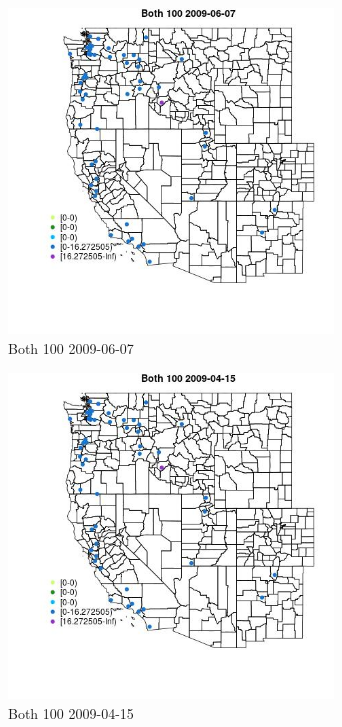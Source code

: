 \begin{figure} 
\centering  
\includegraphics[width=0.77\textwidth]{Code_Outputs/Report_ML_input_PM25_Step4_part_e_de_duplicated_aves_MapObsBoth_1002009-06-07.jpg} 
\caption{\label{fig:Report_ML_input_PM25_Step4_part_e_de_duplicated_avesMapObsBoth_1002009-06-07}Both 100 2009-06-07} 
\end{figure} 
 

\begin{figure} 
\centering  
\includegraphics[width=0.77\textwidth]{Code_Outputs/Report_ML_input_PM25_Step4_part_e_de_duplicated_aves_MapObsBoth_1002009-04-15.jpg} 
\caption{\label{fig:Report_ML_input_PM25_Step4_part_e_de_duplicated_avesMapObsBoth_1002009-04-15}Both 100 2009-04-15} 
\end{figure} 
 

